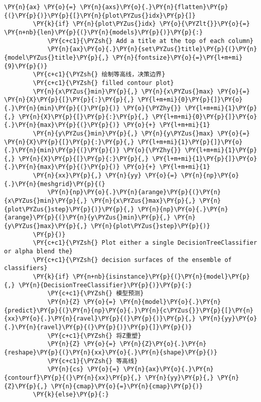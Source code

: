 \begin{Verbatim}[commandchars=\\\{\}]
        \PY{n}{ax} \PY{o}{=} \PY{n}{axs}\PY{o}{.}\PY{n}{flatten}\PY{p}{(}\PY{p}{)}\PY{p}{[}\PY{n}{plot\PYZus{}idx}\PY{p}{]}
        \PY{k}{if} \PY{n}{plot\PYZus{}idx} \PY{o}{\PYZlt{}}\PY{o}{=} \PY{n+nb}{len}\PY{p}{(}\PY{n}{models}\PY{p}{)}\PY{p}{:}
            \PY{c+c1}{\PYZsh{} Add a title at the top of each column}
            \PY{n}{ax}\PY{o}{.}\PY{n}{set\PYZus{}title}\PY{p}{(}\PY{n}{model\PYZus{}title}\PY{p}{,} \PY{n}{fontsize}\PY{o}{=}\PY{l+m+mi}{9}\PY{p}{)}
        \PY{c+c1}{\PYZsh{} 绘制等高线，决策边界}
        \PY{c+c1}{\PYZsh{} filled contour plot}
        \PY{n}{x\PYZus{}min}\PY{p}{,} \PY{n}{x\PYZus{}max} \PY{o}{=} \PY{n}{X}\PY{p}{[}\PY{p}{:}\PY{p}{,} \PY{l+m+mi}{0}\PY{p}{]}\PY{o}{.}\PY{n}{min}\PY{p}{(}\PY{p}{)} \PY{o}{\PYZhy{}} \PY{l+m+mi}{1}\PY{p}{,} \PY{n}{X}\PY{p}{[}\PY{p}{:}\PY{p}{,} \PY{l+m+mi}{0}\PY{p}{]}\PY{o}{.}\PY{n}{max}\PY{p}{(}\PY{p}{)} \PY{o}{+} \PY{l+m+mi}{1}
        \PY{n}{y\PYZus{}min}\PY{p}{,} \PY{n}{y\PYZus{}max} \PY{o}{=} \PY{n}{X}\PY{p}{[}\PY{p}{:}\PY{p}{,} \PY{l+m+mi}{1}\PY{p}{]}\PY{o}{.}\PY{n}{min}\PY{p}{(}\PY{p}{)} \PY{o}{\PYZhy{}} \PY{l+m+mi}{1}\PY{p}{,} \PY{n}{X}\PY{p}{[}\PY{p}{:}\PY{p}{,} \PY{l+m+mi}{1}\PY{p}{]}\PY{o}{.}\PY{n}{max}\PY{p}{(}\PY{p}{)} \PY{o}{+} \PY{l+m+mi}{1}
        \PY{n}{xx}\PY{p}{,} \PY{n}{yy} \PY{o}{=} \PY{n}{np}\PY{o}{.}\PY{n}{meshgrid}\PY{p}{(}
            \PY{n}{np}\PY{o}{.}\PY{n}{arange}\PY{p}{(}\PY{n}{x\PYZus{}min}\PY{p}{,} \PY{n}{x\PYZus{}max}\PY{p}{,} \PY{n}{plot\PYZus{}step}\PY{p}{)}\PY{p}{,} \PY{n}{np}\PY{o}{.}\PY{n}{arange}\PY{p}{(}\PY{n}{y\PYZus{}min}\PY{p}{,} \PY{n}{y\PYZus{}max}\PY{p}{,} \PY{n}{plot\PYZus{}step}\PY{p}{)}
        \PY{p}{)}
        \PY{c+c1}{\PYZsh{} Plot either a single DecisionTreeClassifier or alpha blend the}
        \PY{c+c1}{\PYZsh{} decision surfaces of the ensemble of classifiers}
        \PY{k}{if} \PY{n+nb}{isinstance}\PY{p}{(}\PY{n}{model}\PY{p}{,} \PY{n}{DecisionTreeClassifier}\PY{p}{)}\PY{p}{:}
            \PY{c+c1}{\PYZsh{} 模型预测}
            \PY{n}{Z} \PY{o}{=} \PY{n}{model}\PY{o}{.}\PY{n}{predict}\PY{p}{(}\PY{n}{np}\PY{o}{.}\PY{n}{c\PYZus{}}\PY{p}{[}\PY{n}{xx}\PY{o}{.}\PY{n}{ravel}\PY{p}{(}\PY{p}{)}\PY{p}{,} \PY{n}{yy}\PY{o}{.}\PY{n}{ravel}\PY{p}{(}\PY{p}{)}\PY{p}{]}\PY{p}{)}
            \PY{c+c1}{\PYZsh{} 将Z重塑}
            \PY{n}{Z} \PY{o}{=} \PY{n}{Z}\PY{o}{.}\PY{n}{reshape}\PY{p}{(}\PY{n}{xx}\PY{o}{.}\PY{n}{shape}\PY{p}{)}
            \PY{c+c1}{\PYZsh{} 等高线}
            \PY{n}{cs} \PY{o}{=} \PY{n}{ax}\PY{o}{.}\PY{n}{contourf}\PY{p}{(}\PY{n}{xx}\PY{p}{,} \PY{n}{yy}\PY{p}{,} \PY{n}{Z}\PY{p}{,} \PY{n}{cmap}\PY{o}{=}\PY{n}{cmap}\PY{p}{)}
        \PY{k}{else}\PY{p}{:}

\end{Verbatim}
